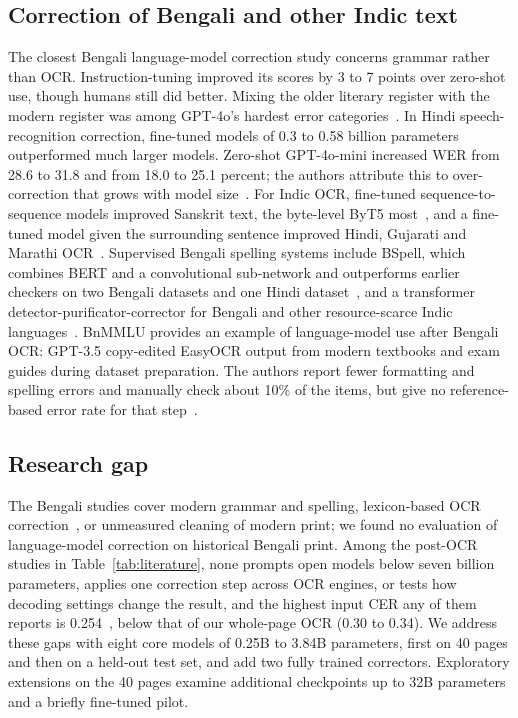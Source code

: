 \documentclass[conference]{IEEEtran}
\begin{document}
\subsection{Correction of Bengali and other Indic text}
The closest Bengali language-model correction study concerns grammar rather than OCR. Instruction-tuning improved its scores by 3 to 7 points over zero-shot use, though humans still did better. Mixing the older literary register with the modern register was among GPT-4o's hardest error categories~\cite{bhattacharyya2025banglagec}. In Hindi speech-recognition correction, fine-tuned models of 0.3 to 0.58 billion parameters outperformed much larger models. Zero-shot GPT-4o-mini increased WER from 28.6 to 31.8 and from 18.0 to 25.1 percent; the authors attribute this to over-correction that grows with model size~\cite{kumar2026postasr}. For Indic OCR, fine-tuned sequence-to-sequence models improved Sanskrit text, the byte-level ByT5 most~\cite{maheshwari2022sanskrit}, and a fine-tuned model given the surrounding sentence improved Hindi, Gujarati and Marathi OCR~\cite{bhandari2026contextual}. Supervised Bengali spelling systems include BSpell, which combines BERT and a convolutional sub-network and outperforms earlier checkers on two Bengali datasets and one Hindi dataset~\cite{rahman2023bspell}, and a transformer detector-purificator-corrector for Bengali and other resource-scarce Indic languages~\cite{bijoy2025transformer}. BnMMLU provides an example of language-model use after Bengali OCR: GPT-3.5 copy-edited EasyOCR output from modern textbooks and exam guides during dataset preparation. The authors report fewer formatting and spelling errors and manually check about 10\% of the items, but give no reference-based error rate for that step~\cite{joy2026bnmmlu}.

\subsection{Research gap}
The Bengali studies cover modern grammar and spelling, lexicon-based OCR correction~\cite{pal2000ocr,ahmed2016improving}, or unmeasured cleaning of modern print; we found no evaluation of language-model correction on historical Bengali print. Among the post-OCR studies in Table~\ref{tab:literature}, none prompts open models below seven billion parameters, applies one correction step across OCR engines, or tests how decoding settings change the result, and the highest input CER any of them reports is 0.254~\cite{koynov2025opportunities}, below that of our whole-page OCR (0.30 to 0.34). We address these gaps with eight core models of 0.25B to 3.84B parameters, first on 40 pages and then on a held-out test set, and add two fully trained correctors. Exploratory extensions on the 40 pages examine additional checkpoints up to 32B parameters and a briefly fine-tuned pilot.
\end{document}
